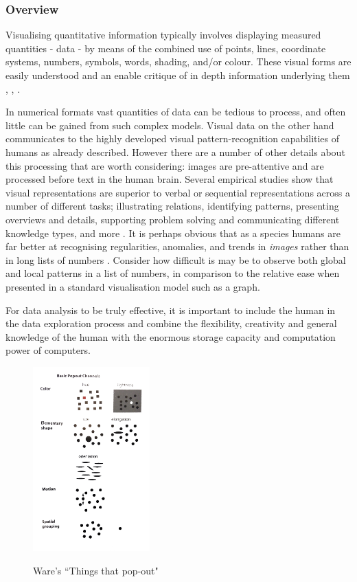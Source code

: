 \documentclass[a4paper,11pt,titlepage]{article}
\begin{document}
	\subsubsection{Overview}
	Visualising quantitative information typically involves displaying measured quantities - data - by means of the combined use of points, lines, coordinate systems, numbers, symbols, words, shading, and/or colour. These visual forms are easily understood and an enable critique of in depth information underlying them \cite{DeFanti1989}, \cite{McCormick1987}, \cite{Tufte2001}.
		\par
		In numerical formats vast quantities of data can be tedious to process, and often little can be gained from such complex models. Visual data on the other hand communicates to the highly developed visual pattern-recognition capabilities of humans as already described. However there are a number of other details about this processing that are worth considering: images are pre-attentive and are processed before text in the human brain. Several empirical studies show that visual representations are superior to verbal or sequential representations across a number of different tasks; illustrating relations, identifying patterns, presenting overviews and details, supporting problem solving and communicating different knowledge types, and more \cite{Burkhard2004}. It is perhaps obvious that as a species humans are far better at recognising regularities, anomalies, and trends in \textit{images} rather than in long lists of numbers \cite{Ware2010}. Consider how difficult is may be to observe both global and local patterns in a list of numbers, in comparison to the relative ease when presented in a standard visualisation model such as a graph.
		\par 
		For data analysis to be truly effective, it is important to include the human in the data exploration process and combine the flexibility, creativity and general knowledge of the human with the enormous storage capacity and computation power of computers.
			  		 
  		\begin{figure}[H]
    			\centering	
			{{\includegraphics[width=0.4\textwidth]
    				{img/ware_popout_channels.png} 
    			}}%
    			\caption{Ware's ``Things that pop-out"}%
    		\label{fig:Ware Pop-Out}
		\end{figure}
		
\end{document}
